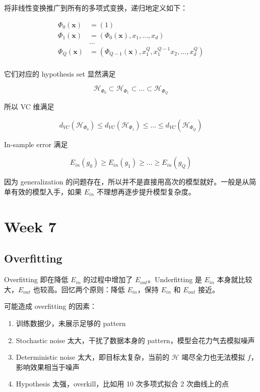 \documentclass[a4paper]{article}
\begin{document}
将非线性变换推广到所有的多项式变换，递归地定义如下：

\begin{equation}
\begin{aligned}
\Phi_0(\mathbf{x}) &= (1) \\
\Phi_1(\mathbf{x}) &= (\Phi_0(\mathbf{x}), x_1, \dots, x_d) \\
                   &\dots \\
\Phi_Q(\mathbf{x}) &= (\Phi_{Q-1}(\mathbf{x}), x_1^Q, x_1^{Q-1}x_2, \dots, x_d^Q) \\
\end{aligned}
\end{equation}

它们对应的 hypothesis set 显然满足

$$\mathcal{H}_{\Phi_0} \subset \mathcal{H}_{\Phi_1} \subset \dots \subset \mathcal{H}_{\Phi_Q}$$

所以 VC 维满足

$$d_{VC}(\mathcal{H}_{\Phi_0}) \le  d_{VC}(\mathcal{H}_{\Phi_1}) \le \dots \le d_{VC}(\mathcal{H}_{\Phi_Q})$$

In-sample error 满足

$$E_{in}(g_0) \ge E_{in}(g_1) \ge \dots \ge E_{in}(g_Q)$$

因为 generalization 的问题存在，所以并不是直接用高次的模型就好。一般是从简单有效的模型入手，如果 $E_{in}$ 不理想再逐步提升模型复杂度。



\section{Week 7}
\subsection{Overfitting}
Overfitting 即在降低 $E_{in}$ 的过程中增加了 $E_{out}$。Underfitting 是 $E_{in}$ 本身就比较大，$E_{out}$ 也较高。回忆两个原则：降低 $E_{in}$，保持 $E_{in}$ 和 $E_{out}$ 接近。

可能造成 overfitting 的因素：
\begin{enumerate}
  \item 训练数据少，未展示足够的 pattern
  \item Stochastic noise 太大，干扰了数据本身的 pattern，模型会花力气去模拟噪声
  \item Deterministic noise 太大，即目标太复杂，当前的 $\mathcal{H}$ 竭尽全力也无法模拟 $f$，影响效果相当于噪声
  \item Hypothesis 太强，overkill，比如用 10 次多项式拟合 2 次曲线上的点
\end{enumerate}
\end{document}
